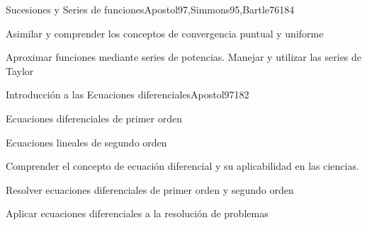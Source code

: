\begin{syllabus}
\begin{unit}{Sucesiones y Series de funciones}{}{Apostol97,Simmons95,Bartle76}{18}{4}
   \begin{learningoutcomes}
      \item Asimilar y comprender los conceptos de convergencia puntual y uniforme
      \item Aproximar funciones mediante series de potencias. Manejar y utilizar las series de Taylor
      \end{learningoutcomes}
\end{unit}

\begin{unit}{Introducción a las Ecuaciones diferenciales}{}{Apostol97}{18}{2}
   \begin{topics}
      \item Ecuaciones diferenciales de primer orden
      \item Ecuaciones lineales de segundo orden
   \end{topics}

   \begin{learningoutcomes}
      \item Comprender el concepto de ecuación diferencial y su aplicabilidad en las ciencias.
      \item Resolver ecuaciones diferenciales de primer orden y segundo orden
      \item Aplicar ecuaciones diferenciales a la resolución de problemas
      \end{learningoutcomes}
\end{unit}

\begin{coursebibliography}
\end{coursebibliography}

\end{syllabus}
